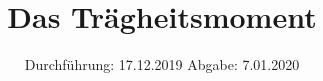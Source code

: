 

\subject{Versuch 101}
\title{Das Trägheitsmoment}
\date{%
  Durchführung: 17.12.2019
  \hspace{3em}
  Abgabe: 7.01.2020
}



\maketitle
\thispagestyle{empty}
\tableofcontents
\newpage






\nocite{*}
\printbibliography{}



